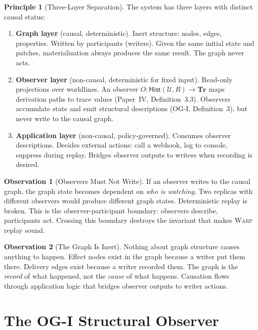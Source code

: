 \documentclass[11pt]{article}
\newcommand{\WARP}{\textsc{Warp}}
\newcommand{\Hist}{\mathsf{Hist}}
\newcommand{\Tr}{\mathbf{Tr}}
\theoremstyle{definition}
\newtheorem{observation}{Observation}
\newtheorem{principle}{Principle}
\begin{document}
\begin{principle}[Three-Layer Separation]
\label{princ:three-layer}
The system has three layers with distinct causal status:
\begin{enumerate}[leftmargin=2em]
\item \textbf{Graph layer} (causal, deterministic). Inert structure:
  nodes, edges, properties. Written by participants (writers). Given
  the same initial state and patches, materialization always produces
  the same result. The graph never acts.

\item \textbf{Observer layer} (non-causal, deterministic for fixed
  input). Read-only projections over worldlines. An observer
  $O : \Hist(\mathcal{U}, R) \to \Tr$ maps derivation paths to trace
  values (Paper~IV, Definition~3.3). Observers accumulate state and
  emit structural descriptions (OG-I, Definition~3), but never write
  to the causal graph.

\item \textbf{Application layer} (non-causal, policy-governed).
  Consumes observer descriptions. Decides external actions: call a
  webhook, log to console, suppress during replay. Bridges observer
  outputs to writers when recording is desired.
\end{enumerate}
\end{principle}

\begin{observation}[Observers Must Not Write]
\label{obs:no-write}
If an observer writes to the causal graph, the graph state becomes
dependent on \emph{who is watching}. Two replicas with different
observers would produce different graph states. Deterministic replay
is broken. This is the observer-participant boundary: observers
describe, participants act. Crossing this boundary destroys the
invariant that makes \WARP{} replay sound.
\end{observation}

\begin{observation}[The Graph Is Inert]
\label{obs:inert}
Nothing about graph structure causes anything to happen. Effect nodes
exist in the graph because a writer put them there. Delivery edges
exist because a writer recorded them. The graph is the \emph{record}
of what happened, not the \emph{cause} of what happens. Causation
flows through application logic that bridges observer outputs to
writer actions.
\end{observation}

\section{The OG-I Structural Observer}
\end{document}
